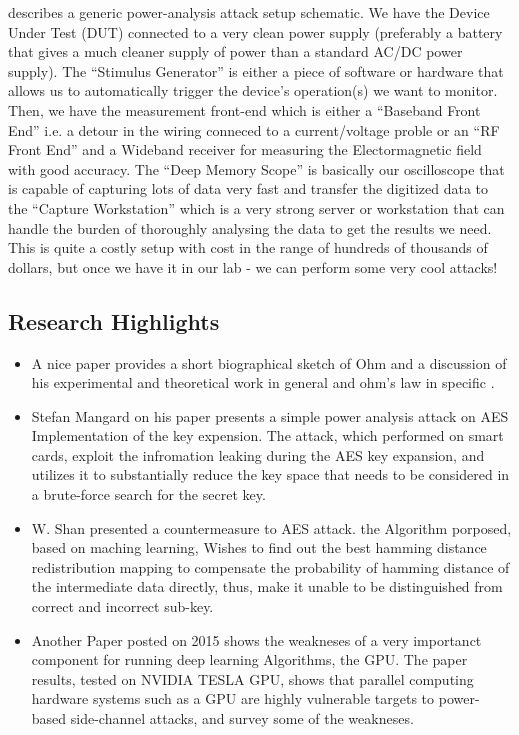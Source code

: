  describes a generic power-analysis attack setup schematic.
We have the Device Under Test (DUT) connected to a very clean power supply (preferably a battery that gives a much cleaner supply of power than a standard AC/DC power supply). The ``Stimulus Generator'' is either a piece of software or hardware that allows us to automatically trigger the device's operation(s) we want to monitor. Then, we have the measurement front-end which is either a ``Baseband Front End'' i.e. a detour in the wiring conneced to a current/voltage proble or an ``RF Front End'' and a Wideband receiver for measuring the Electormagnetic field with good accuracy. The ``Deep Memory Scope'' is basically our oscilloscope that is capable of capturing lots of data very fast and transfer the digitized data to the ``Capture Workstation'' which is a very strong server or workstation that can handle the burden of thoroughly analysing the data to get the results we need.
This is quite a costly setup with cost in the range of hundreds of thousands of dollars, but once we have it in our lab - we can perform some very cool attacks!

\subsection { Research Highlights }

\begin{itemize}
    \item A nice paper provides a short biographical sketch of Ohm and a discussion of his experimental and theoretical work in general and ohm's law in specific \cite{gupta1980georg}.
    \item Stefan Mangard on his paper \cite{mangard2002simple} presents a simple power analysis attack on AES Implementation of the key expension.
    The attack, which performed on smart cards, exploit the infromation leaking during the AES key expansion, 
    and utilizes it to substantially reduce the key space that needs to be considered in a brute-force search for the secret key.
    \item W. Shan \cite{shan2017machine} presented a countermeasure to AES attack. the Algorithm porposed, based
    on maching learning, Wishes to find out the best hamming distance redistribution mapping to compensate the probability of hamming distance of the intermediate data directly,
    thus, make it unable to be distinguished from correct and incorrect sub-key.
    \item Another Paper posted on 2015 \cite{luo2015side} shows the weakneses of a very importanct component for running deep learning Algorithms, the GPU.
    The paper results, tested on NVIDIA TESLA GPU, shows that parallel computing hardware systems such as a GPU are highly vulnerable targets to power-based side-channel attacks,
    and survey some of the weakneses.
\end{itemize}


   
